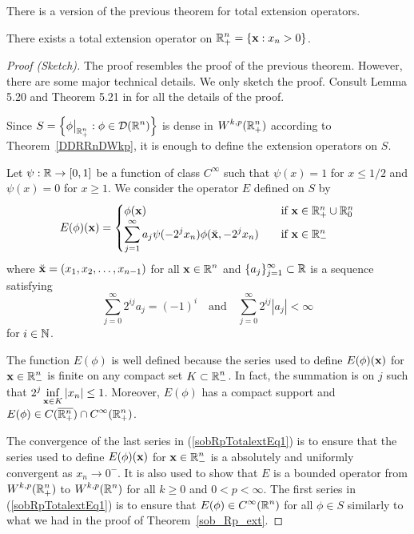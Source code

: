 There is a version of the previous theorem for total extension operators.

\begin{theorem} \label{sob_Rp_Totalext}
There exists a total extension operator on
$\displaystyle \mathbb{R}^n_+ = \{ \mathbf{x} : x_n>0 \}$.
\end{theorem}

\begin{proof}[Proof (Sketch)]
The proof resembles the proof of the previous theorem.  However, there
are some major technical details.  We only sketch the proof.  Consult
Lemma 5.20 and Theorem 5.21 in \cite{Ad} for all the details of the
proof.

Since
$\displaystyle S = \left\{ \phi\big|_{\mathbb{R}^n_+} : \phi \in \mathcal{D}(\mathbb{R}^n) \right\}$
is dense in $\displaystyle W^{k,p}(\mathbb{R}^n_+)$ according to
Theorem~\ref{DDRRnDWkp}, it is enough to define the extension operators
on $S$.

Let $\psi:\mathbb{R} \to [0,1]$ be a function of class $C^\infty$ such that
$\psi(x) = 1$ for $x \leq 1/2$ and $\psi(x) = 0$ for $x \geq 1$.
We consider the operator $E$ defined on $S$ by
\[
E(\phi)(\mathbf{x})
= \begin{cases}
\phi(\mathbf{x}) & \quad \text{if} \ \mathbf{x} \in \mathbb{R}^n_+ \cup \mathbb{R}^n_0 \\
\displaystyle \sum_{j=1}^\infty a_j \psi(-2^jx_n)\phi(\breve{\mathbf{x}},-2^jx_n)
& \quad \text{if} \ \mathbf{x} \in \mathbb{R}^n_-
\end{cases}
\]
where $\breve{\mathbf{x}} = (x_1,x_2,\ldots, x_{n-1})$ for all
$\displaystyle \mathbf{x} \in \mathbb{R}^n$ and
$\displaystyle \{a_j\}_{j=1}^\infty \subset \mathbb{R}$ is a
sequence satisfying
\begin{equation} \label{sobRpTotalextEq1}
\sum_{j=0}^\infty 2^{ij} a_j = (-1)^i \quad \text{and} \quad
\sum_{j=0}^\infty 2^{ij} |a_j| < \infty
\end{equation}
for $i \in \mathbb{N}$.

The function $E(\phi)$ is well defined because the series used to
define $E(\phi)(\mathbf{x})$ for $\displaystyle \mathbf{x} \in \mathbb{R}^n_-$ is finite
on any compact set $\displaystyle K \subset \mathbb{R}^n_-$.  
In fact, the summation is on $j$
such that $\displaystyle 2^j \inf_{\mathbf{x} \in K} |x_n| \leq 1$.
Moreover, $E(\phi)$ has a compact support and
$\displaystyle E(\phi) \in C(\overline{\mathbb{R}^n_+}) \cap C^{\infty}(\mathbb{R}^n_+)$.

The convergence of the last series in (\ref{sobRpTotalextEq1}) is to
ensure that the series used to define $E(\phi)(\mathbf{x})$ for
$\displaystyle \mathbf{x} \in \mathbb{R}^n_-$ is 
a absolutely and uniformly convergent as $x_n \to 0^-$.  It is also
used to show that $E$ is a bounded operator from
$\displaystyle W^{k,p}(\mathbb{R}^n_+)$ to $\displaystyle W^{k,p}(\mathbb{R}^n)$ for
all $k\geq 0$ and $0 < p < \infty$.  The first series in
(\ref{sobRpTotalextEq1}) is to ensure that
$\displaystyle E(\phi) \in C^\infty(\mathbb{R}^n)$
for all $\phi \in S$ similarly to what we had in the proof of
Theorem~\ref{sob_Rp_ext}.
\end{proof}

